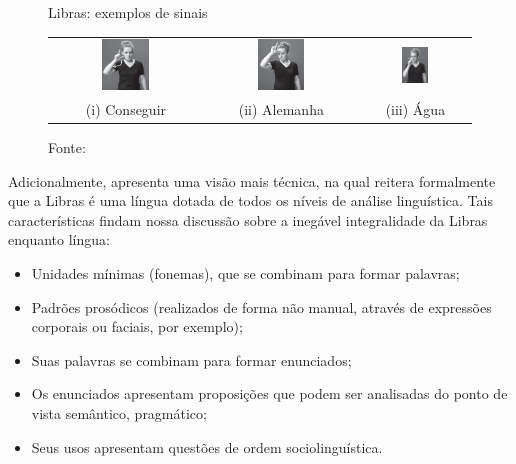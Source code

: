 \begin{figure}[htbp]
\centering
\caption{Libras: exemplos de sinais}
\label{fig:libras-palavras}
\begin{tabular}{ccc} \includegraphics[width=0.331\textwidth]{images/libras-sinal-conseguir.png} &
\includegraphics[width=0.325\textwidth]{images/libras-sinal-alemanha.png} & \includegraphics[width=0.264\textwidth]{images/libras-sinal-agua.png} \\
(i) Conseguir & (ii) Alemanha & (iii) Água \\
\end{tabular}
\caption*{Fonte: }
\end{figure}

Adicionalmente,  apresenta uma visão mais técnica, na qual reitera formalmente que a Libras é uma língua dotada de todos os níveis de análise linguística. Tais características findam nossa discussão sobre a inegável integralidade da Libras enquanto língua:
\begin{itemize}
    \item Unidades mínimas (fonemas), que se combinam para formar palavras;
    \item Padrões prosódicos (realizados de forma não manual, através de expressões corporais ou faciais, por exemplo);
    \item Suas palavras se combinam para formar enunciados;
    \item Os enunciados apresentam proposições que podem ser analisadas do ponto de vista semântico, pragmático;
    \item Seus usos apresentam questões de ordem sociolinguística.
\end{itemize}

